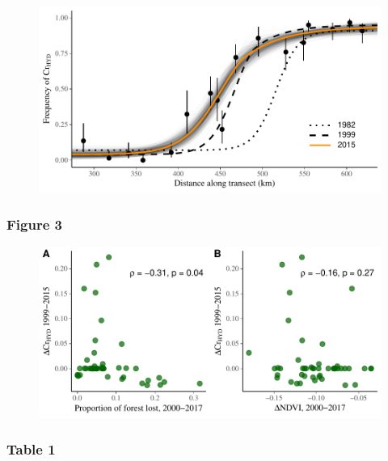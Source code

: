 \documentclass[]{article}
\begin{document}
\begin{figure}[h]
\includegraphics{figure_2}
\end{figure}

\pagebreak

\subsubsection{Figure 3}\label{figure-3}

\begin{figure}[h]
\includegraphics{figure_3}
\end{figure}

\pagebreak

\subsubsection{Table 1}\label{table-1}
\end{document}
